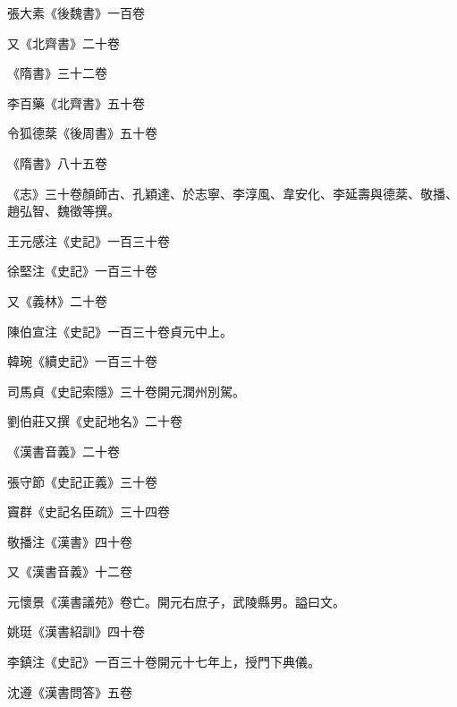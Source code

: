 \begin{pinyinscope}
 張大素《後魏書》一百卷



 又《北齊書》二十卷



 《隋書》三十二卷



 李百藥《北齊書》五十卷



 令狐德棻《後周書》五十卷



 《隋書》八十五卷



 《志》三十卷顏師古、孔穎達、於志寧、李淳風、韋安化、李延壽與德棻、敬播、趙弘智、魏徵等撰。



 王元感注《史記》一百三十卷



 徐堅注《史記》一百三十卷



 又《義林》二十卷



 陳伯宣注《史記》一百三十卷貞元中上。



 韓琬《續史記》一百三十卷



 司馬貞《史記索隱》三十卷開元潤州別駕。



 劉伯莊又撰《史記地名》二十卷



 《漢書音義》二十卷



 張守節《史記正義》三十卷



 竇群《史記名臣疏》三十四卷



 敬播注《漢書》四十卷



 又《漢書音義》十二卷



 元懷景《漢書議苑》卷亡。開元右庶子，武陵縣男。謚曰文。



 姚珽《漢書紹訓》四十卷



 李鎮注《史記》一百三十卷開元十七年上，授門下典儀。



 沈遵《漢書問答》五卷




\end{pinyinscope}
